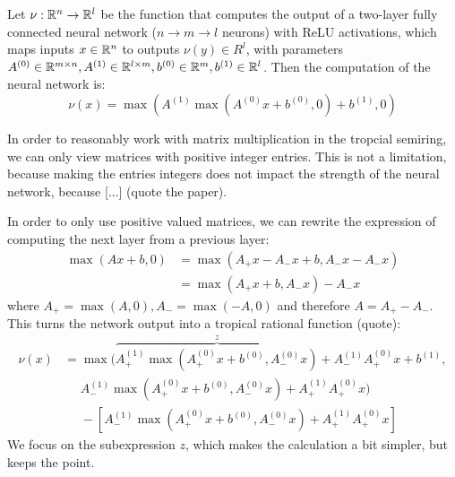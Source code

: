 Let $\nu: \mathbb{R}^n \rightarrow \mathbb{R}^l$ be the function that computes the output of a two-layer fully connected neural network ($n \rightarrow m \rightarrow l$ neurons) with ReLU activations,
which maps inputs $x \in \mathbb{R}^n$ to outputs $\nu(y) \in R^l$, with parameters $A^{(0)} \in \mathbb{R}^{m \times n}, A^{(1)} \in \mathbb{R}^{l \times m}, b^{(0)} \in \mathbb{R}^m, b^{(1)} \in \mathbb{R}^l$.
Then the computation of the neural network is:
$$\nu(x) = \max(A^{(1)}\max(A^{(0)}x + b^{(0)}, 0) + b^{(1)}, 0)$$

In order to reasonably work with matrix multiplication in the tropcial semiring, we can only view matrices with positive integer entries.
This is not a limitation, because making the entries integers does not impact the strength of the neural network, because [...] (quote the paper).

In order to only use positive valued matrices, we can rewrite the expression of computing the next layer from a previous layer:
\begin{align*}
    \max(Ax + b, 0) & = \max(A_+ x - A_- x + b, A_- x - A_- x) \\
                    & = \max(A_+ x + b, A_- x) - A_- x
\end{align*}
where $A_+ = \max(A, 0), A_- = \max(-A, 0)$ and therefore $A = A_+ - A_-$.
This turns the network output into a tropical rational function (quote):
\begin{align*}
    \nu(x) & = \max(\overbrace{A^{(1)}_+ \max(A^{(0)}_+ x + b^{(0)}, A^{(0)}_- x)}^z + A^{(1)}_- A^{(0)}_+ x + b^{(1)}, \\
           & \phantom{{} =} A^{(1)}_- \max(A^{(0)}_+ x + b^{(0)}, A^{(0)}_- x) + A^{(1)}_+ A^{(0)}_+ x)                 \\
           & \phantom{{} =} -\left[A^{(1)}_- \max(A^{(0)}_+ x + b^{(0)}, A^{(0)}_- x) + A^{(1)}_+ A^{(0)}_+ x\right]
\end{align*}
We focus on the subexpression $z$, which makes the calculation a bit simpler, but keeps the point.

